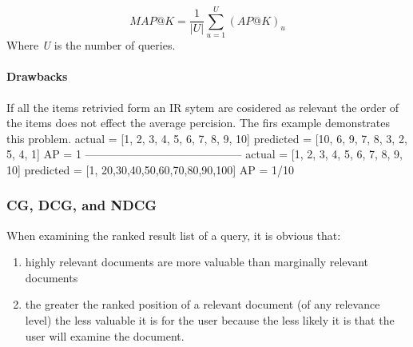 \begin{equation}
	MAP@K = \frac{1}{|U|}\sum_{u=1}^{U}(AP@K)_{u}
	\label{eq:map@k}
\end{equation}
Where \emph{U} is the number of queries.

\paragraph*{Drawbacks}
If all the items retrivied form an IR sytem are cosidered as relevant the order of the items does not effect the average percision.
 The firs example demonstrates this problem.
actual = [1, 2, 3, 4, 5, 6, 7, 8, 9, 10]
predicted = [10, 6, 9, 7, 8, 3, 2, 5, 4, 1]
AP = 1
------------------------------------------
actual = [1, 2, 3, 4, 5, 6, 7, 8, 9, 10]
predicted = [1, 20,30,40,50,60,70,80,90,100]
AP = 1/10

\subsubsection{CG, DCG, and NDCG}
\label{CG, DCG, and NDCG}
When examining the ranked result list of a query, it is obvious that:
\begin{enumerate}
	\item highly relevant documents are more valuable than marginally relevant documents
	\item the greater the ranked position of a relevant document (of any relevance level) the less valuable it is for the user because the less likely it is that the user will examine the document.
\end{enumerate}